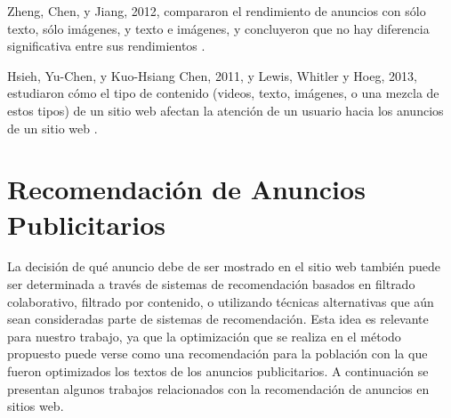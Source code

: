 Zheng, Chen, y Jiang, 2012, compararon el rendimiento de anuncios con sólo texto, sólo imágenes, y texto e imágenes, y concluyeron que no hay diferencia significativa entre sus rendimientos \cite{zheng2012ontology}.

Hsieh, Yu-Chen, y Kuo-Hsiang Chen, 2011, y Lewis, Whitler y Hoeg, 2013, estudiaron cómo el tipo de contenido (videos, texto, imágenes, o una mezcla de estos tipos) de un sitio web afectan la atención de un usuario hacia los anuncios de un sitio web \cite{hsieh2011different} \cite{lewis2013customer}. 













\clearpage
\section{Recomendación de Anuncios Publicitarios}
\label{rec-anuncios}

La decisión de qué anuncio debe de ser mostrado en el sitio web
también puede ser determinada a través de sistemas de recomendación
basados en filtrado colaborativo, filtrado por contenido, o utilizando
técnicas alternativas que aún sean consideradas parte de sistemas
de recomendación. Esta idea es relevante para nuestro trabajo, ya que
la optimización que se realiza en el método propuesto puede verse como
una recomendación para la población con la que fueron optimizados los
textos de los anuncios publicitarios. A continuación se presentan
algunos trabajos relacionados con la recomendación de anuncios en
sitios web.

